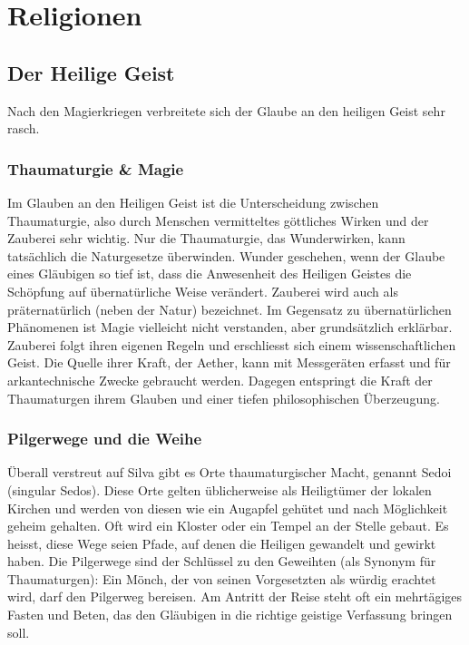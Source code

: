\documentclass[10pt,twoside,twocolumn,openany]{book}
\begin{document}
	

	
\section{Religionen}

 \subsection{Der Heilige Geist}
 Nach den Magierkriegen verbreitete sich der Glaube an den heiligen Geist sehr rasch.
 
	\subsubsection{Thaumaturgie \& Magie}
	Im Glauben an den Heiligen Geist ist die Unterscheidung zwischen Thaumaturgie, also durch Menschen vermitteltes göttliches Wirken und der Zauberei sehr wichtig. Nur die Thaumaturgie, das Wunderwirken, kann tatsächlich die Naturgesetze überwinden. Wunder geschehen, wenn der Glaube eines Gläubigen so tief ist, dass die Anwesenheit des Heiligen Geistes die Schöpfung auf übernatürliche Weise verändert. Zauberei wird auch als präternatürlich (neben der Natur) bezeichnet. Im Gegensatz zu übernatürlichen Phänomenen ist Magie vielleicht nicht verstanden, aber grundsätzlich erklärbar.
	Zauberei folgt ihren eigenen Regeln und erschliesst sich einem wissenschaftlichen Geist. Die Quelle ihrer Kraft, der Aether, kann mit Messgeräten erfasst und für arkantechnische Zwecke gebraucht werden. Dagegen entspringt die Kraft der Thaumaturgen ihrem Glauben und einer tiefen philosophischen Überzeugung.
	
	\subsubsection{Pilgerwege und die Weihe}
	Überall verstreut auf Silva gibt es Orte thaumaturgischer Macht, genannt Sedoi (singular Sedos). Diese Orte gelten üblicherweise als Heiligtümer der lokalen Kirchen und werden von diesen wie ein Augapfel gehütet und nach Möglichkeit geheim gehalten. Oft wird ein Kloster oder ein Tempel an der Stelle gebaut. Es heisst, diese Wege seien Pfade, auf denen die Heiligen gewandelt und gewirkt haben. Die Pilgerwege sind der Schlüssel zu den Geweihten (als Synonym für Thaumaturgen): Ein Mönch, der von seinen Vorgesetzten als würdig erachtet wird, darf den Pilgerweg bereisen. Am Antritt der Reise steht oft ein mehrtägiges Fasten und Beten, das den Gläubigen in die richtige geistige Verfassung bringen soll.
	
\end{document}

